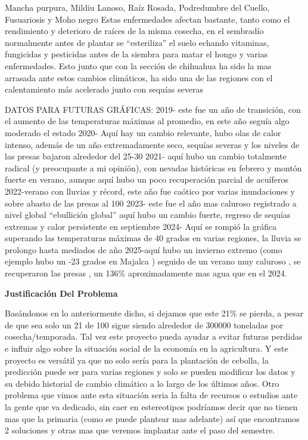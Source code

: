 \documentclass[12pt]{article}
\begin{document}
{{	Mancha purpura, Mildiu Lanoso, Raíz Rosada, Podredumbre del Cuello, Fusuariosis y Moho negro 
	Estas enfermedades afectan bastante, tanto como el rendimiento y deterioro de raíces de la misma cosecha, en el sembradío normalmente antes de plantar se “esteriliza” el suelo echando vitaminas, fungicidas y pesticidas antes de la siembra para matar el hongo y varias enfermedades. 
	Esto junto que con la sección de chihuahua ha sido la mas arrasada ante estos cambios climáticos, ha sido una de las regiones con el calentamiento más acelerado junto con sequías severas 
	
	DATOS PARA FUTURAS GRÁFICAS:
	2019- este fue un año de transición, con el aumento de las temperaturas máximas al promedio, en este año seguía algo moderado el estado 
	2020- Aquí hay un cambio relevante, hubo olas de calor intenso, además de un año extremadamente seco, sequías severas y los niveles de las presas bajaron alrededor del 25-30%
	2021- aquí hubo un cambio totalmente radical (y preocupante a mi opinión), con nevadas históricas en febrero y montón fuerte en verano, aunque aquí hubo un poco recuperación parcial de acuíferos
	2022-verano con lluvias y récord, este año fue caótico por varias inundaciones y sobre abasto de las presas al 100%
	2023- este fue el año mas caluroso registrado a nivel global “ebullición global” aquí hubo un cambio fuerte, regreso de sequías extremas y calor persistente en septiembre 
	2024- Aquí se rompió la gráfica superando las temperaturas máximas de 40 grados en varias regiones, la lluvia se prolongo hasta mediados de año 
	2025-aquí hubo un invierno extremo (como ejemplo hubo un -23 grados en  Majalca ) seguido de un verano muy caluroso , se recuperaron las presas , un 136\% aproximadamente mas agua que en el 2024.
	\newpage
	\begin{center}
		{\huge \textbf{Justificación Del Problema}}
	\end{center}
	\vspace{1cm} 
	{\large %
	Basándonos en lo anteriormente dicho, si dejamos que este 21\% se pierda, a pesar de que sea solo un 21 de 100 sigue siendo alrededor de 300000 toneladas por cosecha/temporada.
	Tal vez este proyecto pueda ayudar a evitar futuras perdidas e influir algo sobre la situación social de la economía en la agricultura.
	Y este proyecto es versátil ya que no solo sería para la plantación de cebolla, la predicción puede ser para varias regiones y solo se pueden modificar los datos y su debido historial de cambio climático a lo largo de los últimos años.
	Otro problema que vimos ante esta situación seria la falta de recursos o estudios ante la gente que va dedicado, sin caer en estereotipos podríamos decir que no tienen mas que la primaria (como se puede plantear mas adelante) así que encontramos 2 soluciones y otras mas que veremos implantar ante el paso del semestre.
}}}
\end{document}
